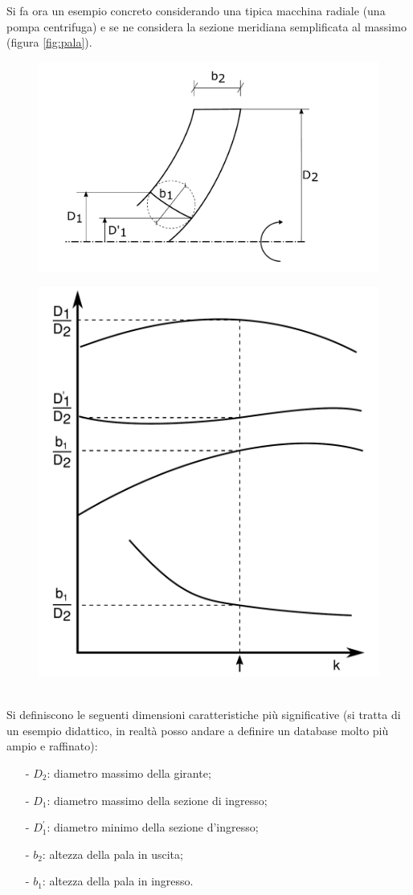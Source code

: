 Si fa ora un esempio concreto considerando una tipica macchina radiale (una pompa centrifuga) e se ne considera la sezione meridiana semplificata al massimo (figura \ref{fig:pala}).
\begin{figure}
\centering
\begin{minipage}{.5\textwidth}
  \centering
  \includegraphics[width=.9\linewidth]{fig/pala.pdf}
  \label{fig:pala}
\end{minipage}%
\begin{minipage}{.5\textwidth}
  \centering
  \includegraphics[width=.6\linewidth]{fig/primo_1.pdf}
  \label{fig:primo_1}
\end{minipage}
\end{figure}
\\Si definiscono le seguenti dimensioni caratteristiche più significative (si tratta di un esempio didattico, in realtà posso andare a definire un database molto più ampio e raffinato):
\begin{itemize}
\item[-]$D_2$: diametro massimo della girante;\\
\item[-]$D_1$: diametro massimo della sezione di ingresso;\\
\item[-]$D_1^{'}$: diametro minimo della sezione d'ingresso;\\
\item[-]$b_2$: altezza della pala in uscita;\\
\item[-]$b_1$: altezza della pala in ingresso.
\end{itemize}
